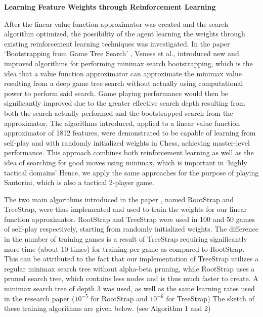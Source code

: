 \documentclass[a4paper,12pt,table]{article}
\begin{document}
\textbf{Learning Feature Weights through Reinforcement Learning}
\newline

After the linear value function approximator was created and the search algorithm optimized, the possibility of the agent learning the weights through existing reinforcement learning techniques was investigated. In the paper ‘Bootstrapping from Game Tree Search’ \cite{Bootstrapping from Game Tree Search}, Veness et al., introduced new and improved algorithms for performing minimax search bootstrapping, which is the idea that a value function approximator can approximate the minimax value resulting from a deep game tree search without actually using computational power to perform said search. Game playing performance would then be significantly improved due to the greater effective search depth resulting from both the search actually performed and the bootstrapped search from the approximator. The algorithms introduced, applied to a linear value function approximator of 1812 features, were demonstrated to be capable of learning from self-play and with randomly initialized weights in Chess, achieving master-level performance.  This approach combines both reinforcement learning as well as the idea of searching for good moves using minimax, which is important in ‘highly tactical domains’ Hence, we apply the same approaches for the purpose of playing Santorini, which is also a tactical 2-player game. \par

The two main algorithms introduced in the paper \cite{Bootstrapping from Game Tree Search}, named RootStrap and TreeStrap, were thus implemented and used to train the weights for our linear function approximator. RootStrap and TreeStrap were used in 100 and 50 games of self-play respectively, starting from randomly initialized weights. The difference in the number of training games is a result of TreeStrap requiring significantly more time (about 10 times) for training per game as compared to RootStrap. This can be attributed to the fact that our implementation of TreeStrap utilizes a regular minimax search tree without alpha-beta pruning, while RootStrap uses a pruned search tree, which contains less nodes and is thus much faster to create. A minimax search tree of depth 3 was used, as well as the same learning rates used in the research paper ($10^{-5}$ for RootStrap and $10^{-6}$ for TreeStrap) The sketch of these training algorithms are given below. (see Algorithm 1 and 2) \par
\end{document}

